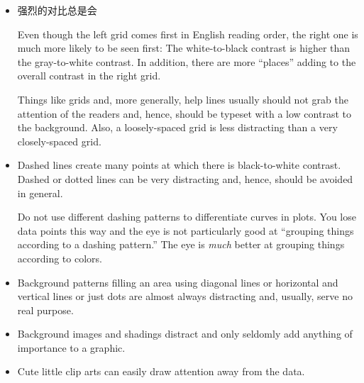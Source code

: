 \begin{itemize}
\item
  强烈的对比总是会

  \medskip\par

  \medskip
  Even though the left grid comes first in English reading order,
  the right one is much more likely to be seen first: The
  white-to-black contrast is higher than the gray-to-white
  contrast. In addition, there are more ``places'' adding to the
  overall contrast in the right grid.

  Things like grids and, more generally, help lines usually should not
  grab the attention of the readers and, hence, should be typeset with
  a low contrast to the background. Also, a loosely-spaced grid is
  less distracting than a very closely-spaced grid.
\item
  Dashed lines create many points at which there is black-to-white
  contrast. Dashed or dotted lines can be very distracting and, hence,
  should be avoided in general.

  Do not use different dashing patterns to differentiate curves in
  plots. You lose data points this way and the eye is not
  particularly good at ``grouping things according to a dashing
  pattern.'' The eye is \emph{much} better at grouping things
  according to colors.
\item
  Background patterns filling an area using  diagonal lines or
  horizontal and vertical lines or just dots are almost always
  distracting and, usually, serve no real purpose.
\item
  Background images and shadings distract and only seldomly add
  anything of importance to a graphic.
\item
  Cute little clip arts can easily draw attention away from the
  data.
\end{itemize}
